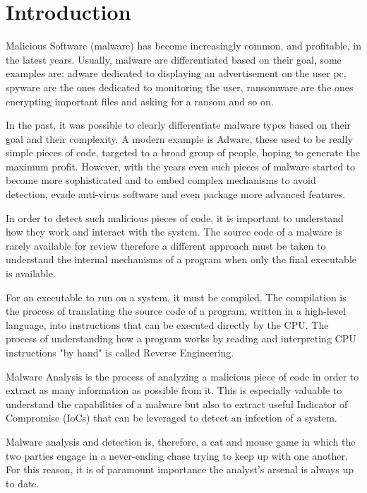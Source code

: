 \chapter{Introduction}

Malicious Software (malware) has become increasingly common, and profitable, in the latest years. Usually, malware are differentiated based on their goal, some examples are: adware dedicated to displaying an advertisement on the user pc, spyware are the ones dedicated to monitoring the user, ransomware are the ones encrypting important files and asking for a ransom and so on. 

In the past, it was possible to clearly differentiate malware types based on their goal and their complexity. A modern example is Adware, these used to be really simple pieces of code, targeted to a broad group of people, hoping to generate the maximum profit. However, with the years even such pieces of malware started to become more sophisticated and to embed complex mechanisms to avoid detection, evade anti-virus software and even package more advanced features\cite{bitdef}.

In order to detect such malicious pieces of code, it is important to understand how they work and interact with the system. The source code of a malware is rarely available for review therefore a different approach must be taken to understand the internal mechanisms of a program when only the final executable is available. 

For an executable to run on a system, it must be compiled. The compilation is the process of translating the source code of a program, written in a high-level language, into instructions that can be executed directly by the CPU. The process of understanding how a program works by reading and interpreting CPU instructions "by hand" is called Reverse Engineering.

Malware Analysis is the process of analyzing a malicious piece of code in order to extract as many information as possible from it. This is especially valuable to understand the capabilities of a malware but also to extract useful Indicator of Compromise (IoCs) that can be leveraged to detect an infection of a system. 

Malware analysis and detection is, therefore, a cat and mouse game in which the two parties engage in a never-ending chase trying to keep up with one another. For this reason, it is of paramount importance the analyst's arsenal is always up to date.

